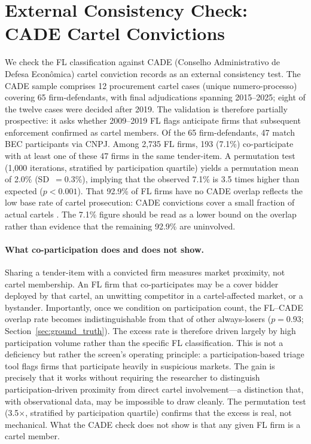 \section{External Consistency Check: CADE Cartel Convictions}
\label{sec:cade}

We check the FL classification against CADE (Conselho Administrativo
de Defesa Econ\^omica) cartel conviction records as an external
consistency test. The CADE sample comprises 12 procurement cartel
cases (unique numero-processo) covering 65 firm-defendants, with
final adjudications spanning 2015--2025; eight of the twelve cases
were decided after 2019. The validation is therefore partially
prospective: it asks whether 2009--2019 FL flags anticipate firms
that subsequent enforcement confirmed as cartel members. Of the 65
firm-defendants, 47 match BEC participants via CNPJ. Among 2,735 FL
firms, 193 (7.1\%) co-participate with at least one of these 47
firms in the same tender-item. A permutation test
(1,000 iterations, stratified by participation quartile) yields a
permutation mean of 2.0\% (SD~$= 0.3$\%), implying that the observed
7.1\% is 3.5 times higher than expected ($p < 0.001$). That 92.9\%
of FL firms have no CADE overlap reflects the low base rate of cartel
prosecution: CADE convictions cover a small fraction of actual cartels
\citep{connor2007price}. The 7.1\% figure should be read as a lower
bound on the overlap rather than evidence that the remaining 92.9\% are
uninvolved.

\paragraph{What co-participation does and does not show.}
Sharing a tender-item with a convicted firm measures market proximity,
not cartel membership. An FL firm that co-participates may be a cover
bidder deployed by that cartel, an unwitting competitor in a
cartel-affected market, or a bystander. Importantly, once we condition
on participation count, the FL--CADE overlap rate becomes
indistinguishable from that of other always-losers ($p = 0.93$;
Section~\ref{sec:ground_truth}). The excess rate is therefore driven
largely by high participation volume rather than the specific FL
classification. This is not a deficiency but rather the screen's operating principle:
a participation-based triage tool flags firms that participate heavily
in suspicious markets. The gain is precisely that it works without
requiring the researcher to distinguish participation-driven proximity
from direct cartel involvement---a distinction that, with observational
data, may be impossible to draw cleanly. The permutation test
(3.5$\times$, stratified by participation quartile) confirms that the
excess is real, not mechanical. What the CADE check does not show is
that any given FL firm is a cartel member.

